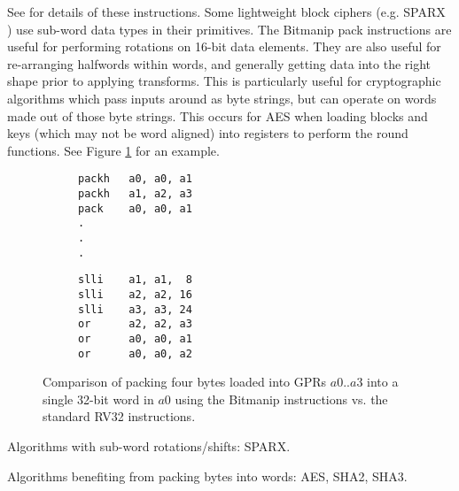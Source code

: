 See \cite[Section 2.1.4]{riscv:bitmanip:draft} for details of
these instructions.
Some lightweight block ciphers
(e.g. SPARX \cite{DPUVGB:16})
use sub-word data types in their primitives.
The Bitmanip pack instructions are useful for performing rotations on
16-bit data elements.
They are also useful for re-arranging halfwords within words, and
generally getting data into the right shape prior to applying transforms.
This is particularly useful for cryptographic algorithms which pass inputs
around as byte strings, but can operate on words made out of those byte
strings.
This occurs for AES when loading blocks and keys (which may not be
word aligned) into registers to perform the round functions.
See Figure \ref{fig:example:pack} for an example.

\begin{figure}
\begin{subfigure}[t]{0.5\textwidth}
\begin{lstlisting}
packh   a0, a0, a1
packh   a1, a2, a3
pack    a0, a0, a1
.
.
.
\end{lstlisting}
\end{subfigure}
\begin{subfigure}[t]{0.5\textwidth}
\begin{lstlisting}
slli    a1, a1,  8
slli    a2, a2, 16
slli    a3, a3, 24
or      a2, a2, a3
or      a0, a0, a1
or      a0, a0, a2
\end{lstlisting}
\end{subfigure}
\caption{Comparison of packing four bytes loaded into GPRs $a0..a3$ into
a single 32-bit word in $a0$ using the Bitmanip \mnemonic[pack*] instructions
vs. the standard RV32 instructions.}
\label{fig:example:pack}
\end{figure}

Algorithms with sub-word rotations/shifts:
SPARX.

Algorithms benefiting from packing bytes into words:
AES, SHA2, SHA3.

